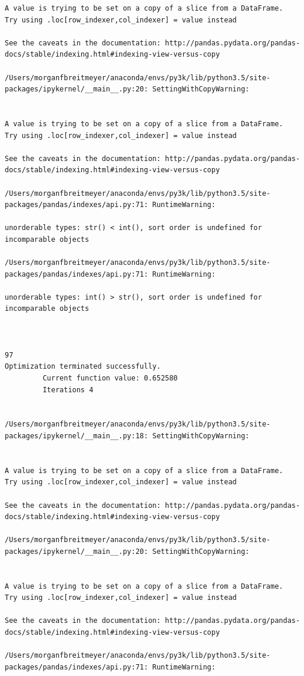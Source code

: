 \begin{lstlisting}
A value is trying to be set on a copy of a slice from a DataFrame.
Try using .loc[row_indexer,col_indexer] = value instead

See the caveats in the documentation: http://pandas.pydata.org/pandas-docs/stable/indexing.html#indexing-view-versus-copy

/Users/morganfbreitmeyer/anaconda/envs/py3k/lib/python3.5/site-packages/ipykernel/__main__.py:20: SettingWithCopyWarning:


A value is trying to be set on a copy of a slice from a DataFrame.
Try using .loc[row_indexer,col_indexer] = value instead

See the caveats in the documentation: http://pandas.pydata.org/pandas-docs/stable/indexing.html#indexing-view-versus-copy

/Users/morganfbreitmeyer/anaconda/envs/py3k/lib/python3.5/site-packages/pandas/indexes/api.py:71: RuntimeWarning:

unorderable types: str() < int(), sort order is undefined for incomparable objects

/Users/morganfbreitmeyer/anaconda/envs/py3k/lib/python3.5/site-packages/pandas/indexes/api.py:71: RuntimeWarning:

unorderable types: int() > str(), sort order is undefined for incomparable objects



97
Optimization terminated successfully.
         Current function value: 0.652580
         Iterations 4


/Users/morganfbreitmeyer/anaconda/envs/py3k/lib/python3.5/site-packages/ipykernel/__main__.py:18: SettingWithCopyWarning:


A value is trying to be set on a copy of a slice from a DataFrame.
Try using .loc[row_indexer,col_indexer] = value instead

See the caveats in the documentation: http://pandas.pydata.org/pandas-docs/stable/indexing.html#indexing-view-versus-copy

/Users/morganfbreitmeyer/anaconda/envs/py3k/lib/python3.5/site-packages/ipykernel/__main__.py:20: SettingWithCopyWarning:


A value is trying to be set on a copy of a slice from a DataFrame.
Try using .loc[row_indexer,col_indexer] = value instead

See the caveats in the documentation: http://pandas.pydata.org/pandas-docs/stable/indexing.html#indexing-view-versus-copy

/Users/morganfbreitmeyer/anaconda/envs/py3k/lib/python3.5/site-packages/pandas/indexes/api.py:71: RuntimeWarning:


\end{lstlisting}
